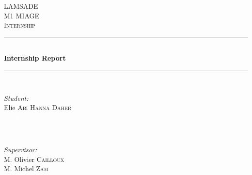 \documentclass{report}
\begin{document}

\begin{titlepage}

\newcommand{\HRule}{\rule{\linewidth}{0.5mm}}
\center

\textsc{\LARGE LAMSADE}\\[1.5cm] 
\textsc{\Large M1 MIAGE}\\[0.5cm]
\textsc{\large Internship}\\[0.5cm] 

\HRule \\[0.4cm]
{ \huge \bfseries Internship Report} 
\HRule \\[1.5cm]

\begin{minipage}{0.4\textwidth}
\begin{flushleft} \large
\emph{Student:}\\
Elie \textsc{Abi Hanna Daher}\\ 
\textcolor{white}{blank space}
\end{flushleft}
\end{minipage}
~
\begin{minipage}{0.4\textwidth}
\begin{flushright} \large
\emph{Supervisor:} \\
M. Olivier \textsc{Cailloux} \\
M. Michel \textsc{Zam} 
\end{flushright}
\end{minipage}\\[2cm]

\newcommand{\mydate}{}
{\large \mydate}\\[2cm] 

\begin{figure}[h]
\\[0.5cm]
\end{figure}

\vfill

\end{titlepage}
\end{document}

